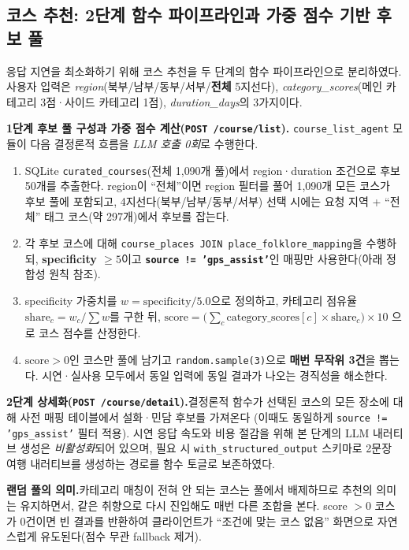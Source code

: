 \documentclass[10pt,twocolumn,a4paper]{article}
\begin{document}
\subsection{코스 추천: 2단계 함수 파이프라인과 가중 점수 기반 후보 풀}

응답 지연을 최소화하기 위해 코스 추천을 두 단계의 함수 파이프라인으로
분리하였다. 사용자 입력은 \emph{region}(북부/남부/동부/서부/\textbf{전체} 5지선다),
\emph{category\_scores}(메인 카테고리 3점·사이드 카테고리 1점), \emph{duration\_days}의
3가지이다.

\textbf{1단계 후보 풀 구성과 가중 점수 계산(\texttt{POST /course/list}).}\quad
\texttt{course\_list\_agent} 모듈이 다음 결정론적 흐름을 \emph{LLM 호출 0회}로
수행한다.

\begin{enumerate}
\setlength{\itemsep}{0pt}
\item SQLite \texttt{curated\_courses}(전체 1{,}090개 풀)에서 region·duration
조건으로 후보 50개를 추출한다. region이 ``전체''이면 region 필터를 풀어
1{,}090개 모든 코스가 후보 풀에 포함되고, 4지선다(북부/남부/동부/서부) 선택
시에는 요청 지역 + ``전체'' 태그 코스(약 297개)에서 후보를 잡는다.
\item 각 후보 코스에 대해 \texttt{course\_places JOIN place\_folklore\_mapping}을
수행하되, \textbf{specificity $\ge 5$}이고 \textbf{\texttt{source != 'gps\_assist'}}인
매핑만 사용한다(아래 정합성 원칙 참조).
\item specificity 가중치를 $w = \mathrm{specificity}/5.0$으로 정의하고, 카테고리
점유율 $\mathrm{share}_c = w_c / \sum w$를 구한 뒤,
$\mathrm{score} = \big(\sum_c \mathrm{category\_scores}[c] \times \mathrm{share}_c\big) \times 10$
으로 코스 점수를 산정한다.
\item $\mathrm{score} > 0$인 코스만 풀에 남기고 \texttt{random.sample(3)}으로
\textbf{매번 무작위 3건}을 뽑는다. 시연·실사용 모두에서 동일 입력에 동일 결과가
나오는 경직성을 해소한다.
\end{enumerate}

\textbf{2단계 상세화(\texttt{POST /course/detail}).}\quad 결정론적 함수가
선택된 코스의 모든 장소에 대해 사전 매핑 테이블에서 설화·민담 후보를 가져온다
(이때도 동일하게 \texttt{source != 'gps\_assist'} 필터 적용). 시연 응답 속도와
비용 절감을 위해 본 단계의 LLM 내러티브 생성은 \emph{비활성화}되어 있으며,
필요 시 \texttt{with\_structured\_output} 스키마로 2문장 여행 내러티브를 생성하는
경로를 함수 토글로 보존하였다.

\textbf{랜덤 풀의 의미.}\quad 카테고리 매칭이 전혀 안 되는 코스는 풀에서
배제하므로 추천의 의미는 유지하면서, 같은 취향으로 다시 진입해도 매번 다른
조합을 본다. score $> 0$ 코스가 0건이면 빈 결과를 반환하여 클라이언트가
``조건에 맞는 코스 없음'' 화면으로 자연스럽게 유도된다(점수 무관 fallback 제거).
\end{document}
